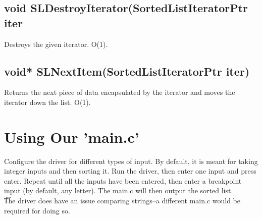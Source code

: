 \documentclass{article}
\begin{document}
\subsection*{void SLDestroyIterator(SortedListIteratorPtr iter}
Destroys the given iterator. O(1).

\subsection*{void* SLNextItem(SortedListIteratorPtr iter)}
Returns the next piece of data encapsulated by the iterator and moves the iterator down the list. O(1).

\section{Using Our 'main.c'}
Configure the driver for different types of input. By default, it is meant for taking integer inputs and then sorting it. Run the driver, then enter one input and press enter. Repeat until all the inputs have been entered, then enter a breakpoint input (by default, any letter). The main.c will then output the sorted list.\\ \t The driver does have an issue comparing strings--a different main.c would be required for doing so.
\end{document}
